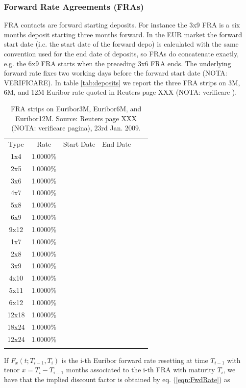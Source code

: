 \documentclass[11pt,reqno]{amsart}
\begin{document}
\subsubsection{\label{SecFRA}Forward Rate Agreements (FRAs)}
FRA contacts are forward starting deposits. For instance the 3x9 FRA is a six months deposit starting three months forward. In the EUR market the forward start date (i.e. the start date of the forward depo) is calculated with the same convention used for the end date of deposits, so FRAs do concatenate exactly, e.g. the 6x9 FRA starts when the preceding 3x6 FRA ends. The underlying forward rate fixes two working days before the forward start date (NOTA: VERIFICARE).
In table \ref{tab:deposits} we report the three FRA strips on 3M, 6M, and 12M Euribor rate quoted in Reuters page XXX (NOTA: verificare ).
\begin{table}[btp]
\label{tab:FRA}
\begin{tabular}{cccccc}
Type & Rate & Start Date & End Date &  &  \\
1x4 & 1.0000\% &  &  &  &  \\
2x5 & 1.0000\% &  &  &  &  \\
3x6 & 1.0000\% &  &  &  &  \\
4x7 & 1.0000\% &  &  &  &  \\
5x8 & 1.0000\% &  &  &  &  \\
6x9 & 1.0000\% &  &  &  &  \\
9x12 & 1.0000\% &  &  &  &  \\
1x7 & 1.0000\% &  &  &  &  \\
2x8 & 1.0000\% &  &  &  &  \\
3x9 & 1.0000\% &  &  &  &  \\
4x10 & 1.0000\% &  &  &  &  \\
5x11 & 1.0000\% &  &  &  &  \\
6x12 & 1.0000\% &  &  &  &  \\
12x18 & 1.0000\% &  &  &  &  \\
18x24 & 1.0000\% &  &  &  &  \\
12x24 & 1.0000\% &  &  &  &  \\
&  &  &  &  &
\end{tabular}%
\caption{FRA strips on Euribor3M, Euribor6M, and Euribor12M. Source: Reuters page XXX (NOTA: verificare pagina), 23rd Jan. 2009.}
\end{table}
If $F_{x}\left(t;T_{i-1},T_{i}\right)$ is the i-th Euribor forward rate resetting at time $T_{i-1}$ with tenor $x=T_{i}-T_{i-1}$ months associated to the i-th FRA with maturity $T_i$, we have that the implied discount factor is obtained by eq. (\ref{eqn:FwdRate}) as
\end{document}
